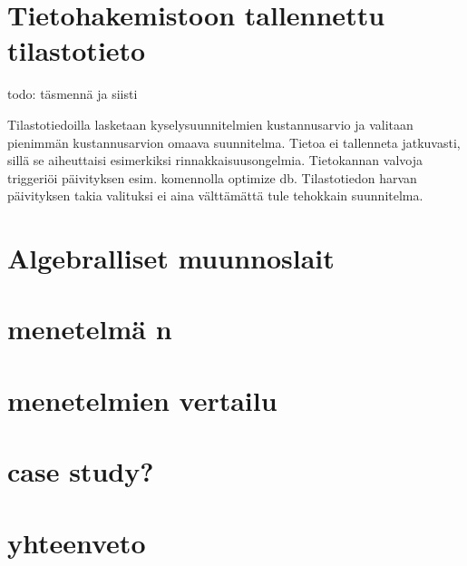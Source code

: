 \documentclass[finnish]{tktltiki2}
\theoremstyle{definition}
\theoremstyle{remark}
\begin{document}
\cite{jarke1984}
\cite{chaudhuri1998}
\cite{freytag1987rule}
\cite{ono1990}
\cite{graefe1993query}
\cite{chu1999least}
\cite{aho1979}
\cite{cole1994}
\cite{mahajan2012}

\section{Tietohakemistoon tallennettu tilastotieto}
todo: täsmennä ja siisti

Tilastotiedoilla lasketaan kyselysuunnitelmien kustannusarvio ja valitaan pienimmän kustannusarvion omaava suunnitelma.
Tietoa ei tallenneta jatkuvasti, sillä se aiheuttaisi esimerkiksi rinnakkaisuusongelmia. Tietokannan valvoja 
triggeriöi päivityksen esim. komennolla optimize db. Tilastotiedon harvan päivityksen takia valituksi ei aina välttämättä tule 
tehokkain suunnitelma.
\section{Algebralliset muunnoslait} %
\section{menetelmä n}
\section{menetelmien vertailu}
\section{case study?}
\section{yhteenveto}



%
%
% 
%



\end{document}
